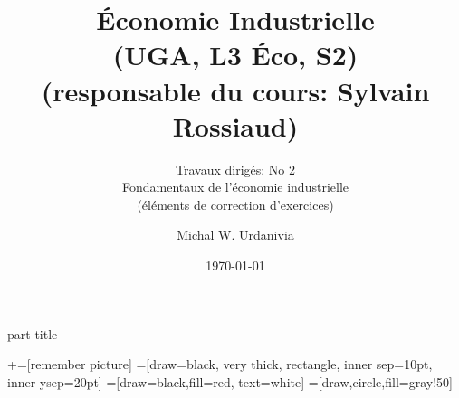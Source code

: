 
\usepackage{color}
\usepackage{tikz}

\usepackage{enumerate}   


%
  \usepackage{eso-pic}

{
    \begin{centering}
    \begin{beamercolorbox}[sep=11pt,center]{part title}
    \insertsection\par
    \end{beamercolorbox}
    \end{centering}
}
\title[]{ \textbf{Économie Industrielle} \\ (UGA, L3 Éco, S2) \\ (responsable du cours: Sylvain Rossiaud)}
\subtitle{Travaux dirigés: No 2\\ 
Fondamentaux de l'économie industrielle\\(éléments de correction d'exercices)}
\date{\today}
\author{Michal W. Urdanivia\inst{*}}




\usetikzlibrary{positioning}
\usetikzlibrary{snakes}
\usetikzlibrary{calc}
\usetikzlibrary{arrows}
\usetikzlibrary{decorations.markings}
\usetikzlibrary{shapes.misc}
\usetikzlibrary{matrix,shapes,arrows,fit,tikzmark}
\usetikzlibrary{shapes}
\newcommand\marktopleft[1]{
    \tikz[overlay,remember picture] 
        \node (marker-#1-a) at (-.3em,.3em) {};%
}
\newcommand\markbottomright[2]{%
    \tikz[overlay,remember picture] 
        \node (marker-#1-b) at (0em,0em) {};%
}
+=[remember picture] 
 =[draw=black, very thick, rectangle, inner sep=10pt, inner ysep=20pt]
 =[draw=black,fill=red, text=white]
=[draw,circle,fill=gray!50]



